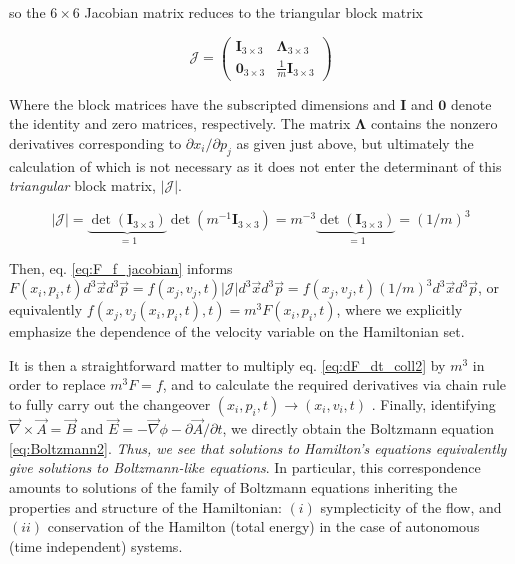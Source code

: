\documentclass[11pt,titlepage]{report}
\begin{document}
\noindent so the $6\times 6$ Jacobian matrix reduces to the triangular block matrix

\begin{equation}
\mathcal{J} = \begin{pmatrix}
       \boldsymbol{I}_{3\times 3} &  \boldsymbol{\Lambda}_{3\times 3}    \\[0.3em]
        \boldsymbol{0}_{3\times 3}         &  \frac{1}{m}\boldsymbol{I}_{3\times 3}
     \end{pmatrix}\nonumber \end{equation}

\noindent Where the block matrices have the subscripted dimensions and $\boldsymbol{I}$ and $\boldsymbol{0}$ denote the identity and zero matrices, respectively. The matrix $\boldsymbol{\Lambda}$ contains the nonzero derivatives corresponding to $\partial x_i / \partial p_j$ as given just above, but ultimately the calculation of which is not necessary as it does not enter the determinant of this \emph{triangular} block matrix, $|\mathcal{J}|$.

$$|\mathcal{J}| = \underbrace{\det(\boldsymbol{I}_{3\times 3})}_{\, = 1}\det( m^{-1} \boldsymbol{I}_{3\times 3}) = m^{-3} \underbrace{\det(\boldsymbol{I}_{3\times 3})}_{\, = 1} = (1/m)^3 $$

\noindent Then, eq. \eqref{eq:F_f_jacobian} informs $F(x_i,p_i,t)d^3\vec{x}d^3\vec{p}  =  f(x_j,v_j,t) |\mathcal{J}| d^3\vec{x}d^3\vec{p} = f(x_j, v_j,t) (1/m)^3 d^3\vec{x}d^3\vec{p}$, or equivalently $f(x_j,v_j(x_i,p_i,t),t) = m^3 F(x_i,p_i,t)$, where we explicitly emphasize the dependence of the velocity variable on the Hamiltonian set.

It is then a straightforward matter to multiply eq. \eqref{eq:dF_dt_coll2} by $m^3$ in order to replace $m^3 F = f$, and to calculate the required derivatives via chain rule to fully carry out the changeover $(x_i,p_i,t) \rightarrow (x_i,v_i,t)$ \cite[p.249]{Miyamoto}. Finally, identifying $\vec{\nabla}\times \vec{A} = \vec{B}$ and $\vec{E} = -\vec{\nabla}\phi - \partial \vec{A} / \partial t$, we directly obtain the Boltzmann equation \eqref{eq:Boltzmann2}. \emph{Thus, we see that solutions to Hamilton's equations equivalently give solutions to Boltzmann-like equations}. In particular, this correspondence amounts to solutions of the family of Boltzmann equations inheriting the properties and structure of the Hamiltonian: $(i)$ symplecticity of the flow, and $(ii)$ conservation of the Hamilton (total energy) in the case of autonomous (time independent) systems.
\end{document}
